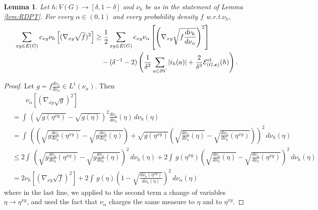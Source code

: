 \documentclass[11pt]{amsart}
\theoremstyle{plain}
\newtheorem{lemma}{Lemma}[section]
\theoremstyle{definition}
\theoremstyle{remark}
\begin{document}
\begin{lemma}
\label{lem:timechange}
Let $h: V(G)\to [\delta, 1-\delta]$ and $\nu_h$ be as in the statement of Lemma \ref{lem:RDPT}. For every $\alpha\in (0,1)$ and every probability density $f$ w.r.t.\@ $\nu_h$,
\begin{align}
\label{ineq:timechange}
\sum_{xy\in E(G)} c_{xy} \nu_h\left[(\nabla_{xy}\sqrt{f})^2\right] &\geq \frac{1}{2} \sum_{xy\in E(G)} c_{xy} \nu_\alpha\left[\left(\nabla_{xy} \sqrt{f\frac{d\nu_h}{d\nu_\alpha}}\right)^2\right] \\
\nonumber & \quad - (\delta^{-1}-2)  \left( \frac{1}{\delta^2}\sum_{a\in \partial V} |i_h(a)| + \frac{2}{\delta^3} \mathcal{E}^{\rm el}_{(G,{\bf c})}(h)\right).
\end{align}
\end{lemma}
\begin{proof}
Let $g = f\frac{d\nu_h}{d\nu_\alpha} \in L^1(\nu_\alpha)$. Then
\begin{align}
\label{eq:string}
& \qquad \nu_\alpha\left[\left(\nabla_{xy} \sqrt{g}\right)^2\right] \\ 
\nonumber &= \int\, \left(\sqrt{g(\eta^{xy})}-\sqrt{g(\eta)}\right)^2 \frac{d\nu_\alpha}{d\nu_h}(\eta)\, d\nu_h(\eta) \\
\nonumber &= \int\, \left(\left(\sqrt{g\frac{d\nu_\alpha}{d\nu_h}(\eta^{xy})}-\sqrt{g\frac{d\nu_\alpha}{d\nu_h}(\eta)}\right) + \sqrt{g(\eta^{xy})}\left(\sqrt{\frac{d\nu_\alpha}{d\nu_h}(\eta)}-\sqrt{\frac{d\nu_\alpha}{d\nu_h}(\eta^{xy})} \right) \right)^2\, d\nu_h(\eta)\\
\nonumber &\leq 2 \int\, \left(\sqrt{g\frac{d\nu_\alpha}{d\nu_h}(\eta^{xy})} - \sqrt{g\frac{d\nu_\alpha}{d\nu_h}(\eta)}\right)^2\, d\nu_h(\eta) + 2\int\, g(\eta^{xy}) \left( \sqrt{\frac{d\nu_\alpha}{d\nu_h}(\eta)} - \sqrt{\frac{d\nu_\alpha}{d\nu_h}(\eta^{xy})}\right)^2\,d\nu_h(\eta) \\
\nonumber &= 2 \nu_h\left[\left(\nabla_{xy} \sqrt{f}\right)^2\right] + 2 \int\, g(\eta) \left( 1- \sqrt{\frac{d\nu_h(\eta^{xy})}{d\nu_h(\eta)} }\right)^2 \, d\nu_\alpha(\eta)
\end{align}
where in the last line, we applied to the second term a change of variables $\eta \to \eta^{xy}$, and used the fact that $\nu_\alpha$ charges the same measure to $\eta$ and to $\eta^{xy}$.


\end{proof}
\end{document}
